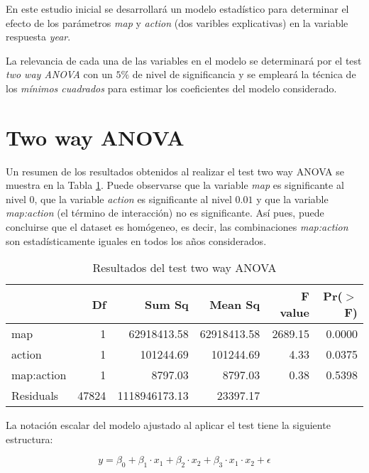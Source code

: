\documentclass[10pt,a4paper]{article}
\begin{document}
En este estudio inicial se desarrollará un modelo estadístico para determinar el efecto de los parámetros \emph{map} y \emph{action} (dos varibles explicativas) en la variable respuesta \emph{year}.

La relevancia de cada una de las variables en el modelo se determinará por el test \emph{two way ANOVA} con un $5\%$ de nivel de significancia y se empleará la técnica de los \emph{mínimos cuadrados} para estimar los coeficientes del modelo considerado.

\section{Two way ANOVA}

Un resumen de los resultados obtenidos al realizar el test two way ANOVA se muestra en la Tabla \ref{table:3}. Puede observarse que la variable \emph{map} es significante al nivel $0$, que la variable \emph{action} es significante al nivel $0.01$ y que la variable \emph{map:action} (el término de interacción) no es significante. Así pues, puede concluirse que el dataset es homógeneo, es decir, las combinaciones \emph{map:action} son estadísticamente iguales en todos los años considerados.

\begin{table}[ht]
\centering
\begin{tabular}{lrrrrr}
  \hline
 & Df & Sum Sq & Mean Sq & F value & Pr($>$F) \\ 
  \hline
map         & 1 & 62918413.58 & 62918413.58 & 2689.15 & 0.0000 \\ 
  action      & 1 & 101244.69 & 101244.69 & 4.33 & 0.0375 \\ 
  map:action  & 1 & 8797.03 & 8797.03 & 0.38 & 0.5398 \\ 
  Residuals   & 47824 & 1118946173.13 & 23397.17 &  &  \\ 
   \hline
\end{tabular}
\caption{Resultados del test two way ANOVA}
\label{table:3}
\end{table}

La notación escalar del modelo ajustado al aplicar el test tiene la siguiente estructura:

\begin{equation}
    y = \beta_0 + \beta_1 \cdot x_1 + \beta_2 \cdot x_2 + \beta_3 \cdot x_1 \cdot x_2 + \epsilon
\label{eq1}
\end{equation}
\end{document}
